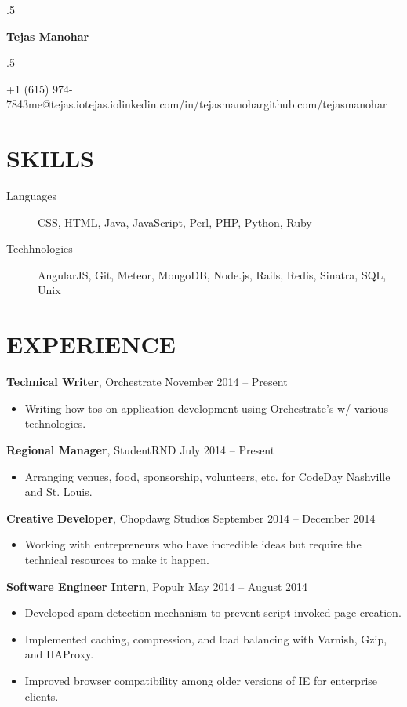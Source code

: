 \documentclass{res}
\newcommand*{\its}{\hspace{0.8cm}}
\begin{document}
\moveleft.5\hoffset\centerline{\Huge\bf Tejas Manohar}
\bigskip
\moveleft.5\hoffset\centerline{+1 (615) 974-7843\its{}me@tejas.io\its{}\its{}tejas.io\its{}linkedin.com/in/tejasmanohar\its{}github.com/tejasmanohar}

\section{SKILLS}

\begin{description}
  \item[Languages] CSS, HTML, Java, JavaScript, Perl, PHP, Python, Ruby
  \item[Techhnologies] AngularJS, Git, Meteor, MongoDB, Node.js, Rails, Redis, Sinatra, SQL, Unix
\end{description}

\section{EXPERIENCE}

{\bf Technical Writer}, Orchestrate \hfill November 2014 -- Present
\begin{itemize} \itemsep -2pt
  \item Writing how-tos on application development using Orchestrate's w/ various technologies.
\end{itemize}

{\bf Regional Manager}, StudentRND \hfill July 2014 -- Present
\begin{itemize} \itemsep -2pt
  \item Arranging venues, food, sponsorship, volunteers, etc. for CodeDay Nashville and St. Louis.
\end{itemize}

{\bf Creative Developer}, Chopdawg Studios \hfill September 2014 -- December 2014
\begin{itemize} \itemsep -2pt
  \item Working with entrepreneurs who have incredible ideas but require the technical resources to make it happen.
\end{itemize}

{\bf Software Engineer Intern}, Populr \hfill May 2014 -- August 2014
\begin{itemize} \itemsep -2pt
  \item Developed spam-detection mechanism to prevent script-invoked page creation.
  \item Implemented caching, compression, and load balancing with Varnish, Gzip, and HAProxy.
  \item Improved browser compatibility among older versions of IE for enterprise clients.
\end{itemize}
\end{document}
